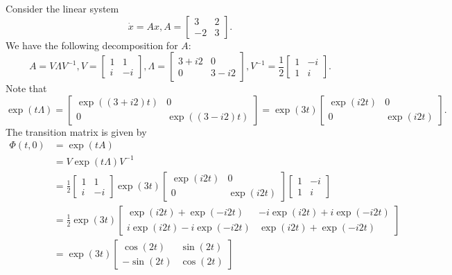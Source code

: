 \begin{refsection}
\begin{example}
	Consider the linear system 
	$$\dot{x} = Ax, A = \begin{bmatrix}
	3 & 2\\
	-2 & 3
	\end{bmatrix}.$$
	We have the following decomposition for $A$:
	$$A = V\Lambda V^{-1}, V=\begin{bmatrix}
	1 & 1\\
	i & -i
	\end{bmatrix},\Lambda=\begin{bmatrix}
	3+i2 & 0\\
	0 & 3-i2
	\end{bmatrix},V^{-1}=\frac{1}{2}\begin{bmatrix}
	1 & -i\\
	1 & i
	\end{bmatrix}.$$
	Note that
	$$\exp(t\Lambda) = \begin{bmatrix}
	\exp((3+i2)t) & 0\\
	0 & \exp((3-i2)t)
	\end{bmatrix} = \exp(3t)\begin{bmatrix}
	\exp(i2t) & 0\\
	0 & \exp(i2t)
	\end{bmatrix}.$$
	The transition matrix is given by
	\begin{align*}
	\Phi(t,0) &= \exp(tA) \\
	& = V\exp(t\Lambda)V^{-1} \\
	& = \frac{1}{2}\begin{bmatrix}
	1 & 1\\
	i & -i
	\end{bmatrix}\exp(3t)\begin{bmatrix}
	\exp(i2t) & 0\\
	0 & \exp(i2t)
	\end{bmatrix}\begin{bmatrix}
	1 & -i\\
	1 & i
	\end{bmatrix} \\
	&=\frac{1}{2}\exp(3t)\begin{bmatrix}
	\exp(i2t)+\exp(-i2t) & -i\exp(i2t)+i\exp(-i2t)\\
	i\exp(i2t)-i\exp(-i2t) & \exp(i2t)+\exp(-i2t)
	\end{bmatrix} \\
	&=\exp(3t)\begin{bmatrix}
	\cos(2t) & \sin(2t)\\
	-\sin(2t) & \cos(2t)
	\end{bmatrix}
	\end{align*}
\end{example}



\end{refsection}
